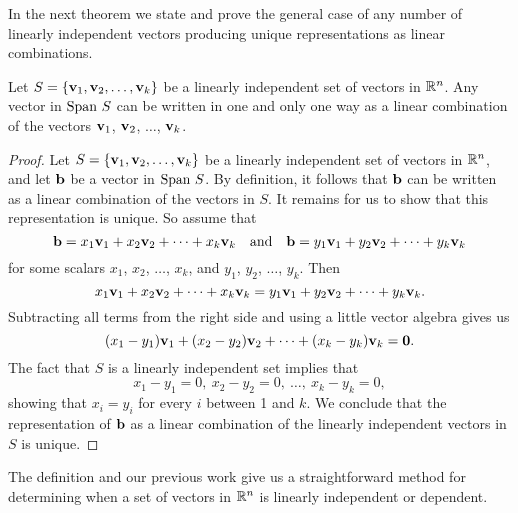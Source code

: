 In the next theorem we state and prove the general case of any number of linearly independent vectors producing unique representations as linear combinations.



\begin{theorem} \label{thm:1_f_unique_representation} Let $S = \{\mathbf{v}_1, \mathbf{v}_2, \ldots, \mathbf{v}_k\}$ be a linearly independent set of vectors in $\mathbb{R}^n$. Any vector in $\text{Span} \ S$ can be written in one and only one way as a linear combination of the vectors $\mathbf{v}_1$, $\mathbf{v}_2$, $\ldots$, $\mathbf{v}_k$.  
\end{theorem}

\begin{proof} Let $S = \{\mathbf{v}_1, \mathbf{v}_2, \ldots, \mathbf{v}_k\}$ be a linearly independent set of vectors in $\mathbb{R}^n$, and let $\mathbf{b}$ be a vector in $\text{Span} \ S$. By definition, it follows that $\mathbf{b}$ can be written as a linear combination of the vectors in $S$. It remains for us to show that this representation is unique. So assume that 
\begin{equation} \label{eq:1_f_1} 
\vb = x_1 \vv_1 + x_2 \vv_2 + \cdots + x_k \vv_k \ \ \text{ and } \ \ \vb = y_1\vv_1 + y_2 \vv_2 + \cdots + y_k \vv_k
\end{equation}
for some scalars $x_1$, $x_2$, $\ldots$, $x_k$, and $y_1$, $y_2$, $\ldots$, $y_k$. Then 
\[x_1 \mathbf{v}_1 + x_2 \mathbf{v}_2 + \cdots + x_k \mathbf{v}_k = y_1\mathbf{v}_1 + y_2 \mathbf{v}_2 + \cdots + y_k \mathbf{v}_k.\]
Subtracting all terms from the right side and using a little vector algebra gives us 
\[(x_1-y_1) \mathbf{v}_1 + (x_2-y_2) \mathbf{v}_2 + \cdots + (x_k-y_k) \mathbf{v}_k = \mathbf{0}.\]
 The fact that $S$ is a linearly independent set implies that 
 \[x_1-y_1=0, \ x_2-y_2 = 0, \ \ldots, \ x_k-y_k=0,\]
showing that $x_i=y_i$ for every $i$ between 1 and $k$. We conclude that the representation of $\mathbf{b}$ as a linear combination of the linearly independent vectors in $S$ is unique. 

\end{proof}



The definition and our previous work give us a straightforward method for determining when a set of vectors in $\mathbb{R}^n$ is linearly independent or dependent.  



